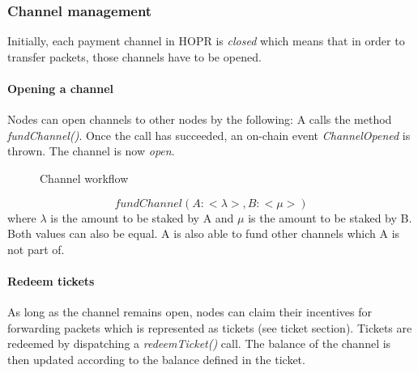 \subsubsection{Channel management}
Initially, each payment channel in HOPR is \textit{closed} which means that in order to transfer packets, those channels have to be opened.
\paragraph{Opening a channel} Nodes can open channels to other nodes by the following:
A calls the method \textit{fundChannel()}. Once the call has succeeded, an on-chain event \textit{ChannelOpened} is thrown. The channel is now \textit{open}.

\begin{figure}
    \begin{center}
    \end{center}
    \label{fig:channel workflow}
    \caption{Channel workflow}
\end{figure}

$$fundChannel(A: <\lambda>, B: <\mu>)$$ where $\lambda$ is the amount to be staked by A and $\mu$ is the amount to be staked by B. Both values can also be equal. A is also able to fund other channels which A is not part of.

\paragraph{Redeem tickets}
As long as the channel remains open, nodes can claim their incentives for forwarding packets which is represented as tickets (see ticket section). Tickets are redeemed by dispatching a \textit{redeemTicket()} call. The balance of the channel is then updated according to the balance defined in the ticket.
